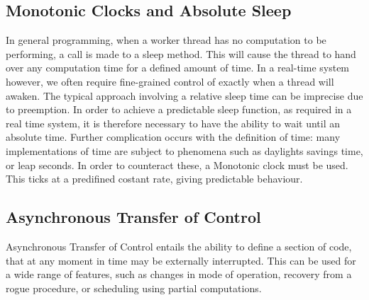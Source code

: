 \subsection{Monotonic Clocks and Absolute Sleep}
In general programming, when a worker thread has no computation to be 
performing, a call is made to a sleep method. This will cause the thread
to hand over any computation time for a defined amount of time. In a 
real-time system however, we often require fine-grained control of exactly
when a thread will awaken. The typical approach involving a relative sleep 
time can be imprecise due to preemption. In order to achieve a predictable 
sleep function, as required in a real time system, it is therefore necessary 
to have the ability to wait until an absolute time. Further complication 
occurs with the definition of time: many implementations of time are subject 
to phenomena such as daylights savings time, or leap seconds. 
In order to counteract these, a Monotonic clock must be used. This ticks at a 
predifined costant rate, giving predictable behaviour. 

\subsection{Asynchronous Transfer of Control}
Asynchronous Transfer of Control entails the ability to define a section of code, 
that at any moment in time may be externally interrupted. This can be used for a 
wide range of features, such as changes in mode of operation, recovery from a 
rogue procedure, or scheduling using partial computations.
